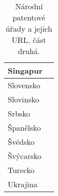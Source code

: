 \begin{table}[H]
\begin{tabular}{|>{\centering\arraybackslash}p{2.2cm}|>{\centering\arraybackslash}p{9cm}|}
	Singapur & \MYhref{http://www.ipos.gov.sg/}{http://www.ipos.gov.sg/}\\
	\hline
	Slovensko & \MYhref{https://www.indprop.gov.sk/}{https://www.indprop.gov.sk/} \\
	\hline
	Slovinsko & \MYhref{http://www.uil-sipo.si/}{http://www.uil-sipo.si/}\\
	\hline
	Srbsko & \MYhref{http://www.zis.gov.rs/}{http://www.zis.gov.rs/} \\
	\hline
	Španělsko & \MYhref{http://www.oepm.es/}{http://www.oepm.es/}\\
	\hline
	Švédsko & \MYhref{http://www.prv.se/}{http://www.prv.se/}  \\
	\hline
	Švýcarsko & \MYhref{https://www.ige.ch/}{https://www.ige.ch/} \\
	\hline
	Turecko & \MYhref{http://www.turkpatent.gov.tr/}{http://www.turkpatent.gov.tr/} \\
	\hline
	Ukrajina & \MYhref{https://ukrpatent.org/en}{https://ukrpatent.org/en}\\
	\hline
	\end{tabular}
	\caption{Národní patentové úřady a jejich URL, část druhá.}
	\label{tab:table_offices2_url}
	\end{table}